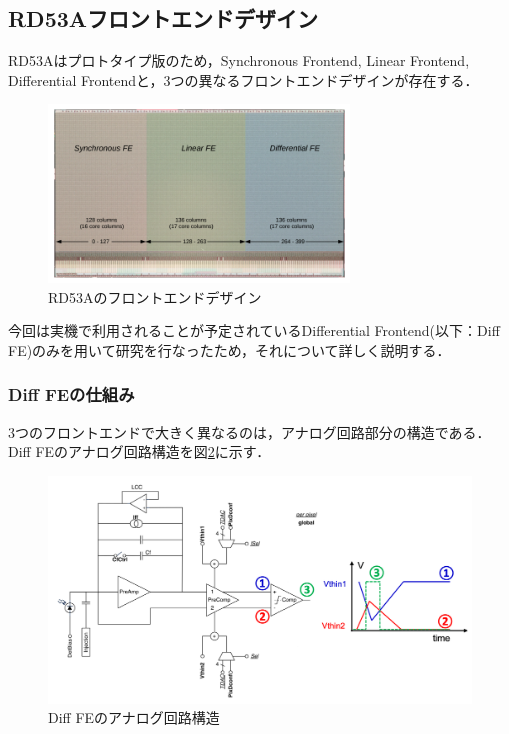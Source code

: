 \subsection{RD53Aフロントエンドデザイン}
RD53Aはプロトタイプ版のため，Synchronous Frontend, Linear Frontend, Differential Frontendと，3つの異なるフロントエンドデザインが存在する．

\begin{figure}[h]
\centering
\includegraphics[width=8cm]{./figure/RD53A_FE.png}
\caption{RD53Aのフロントエンドデザイン\cite{Garcia-Sciveres:2287593}}
\label{fig:RD53AFE}
\end{figure}

今回は実機で利用されることが予定されているDifferential Frontend(以下：Diff FE)のみを用いて研究を行なったため，それについて詳しく説明する．

\subsubsection*{Diff FEの仕組み}
3つのフロントエンドで大きく異なるのは，アナログ回路部分の構造である．Diff FEのアナログ回路構造を図\ref{fig:DiffFE}に示す．\par

\begin{figure}[h]
\centering
\includegraphics[width=15cm]{./figure/RD53A_DiffFE.png}
\caption{Diff FEのアナログ回路構造\cite{Garcia-Sciveres:2287593}}
\label{fig:DiffFE}
\end{figure}

